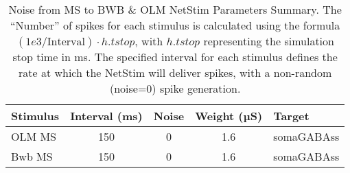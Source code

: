 \begin{table}[htbp]
    \centering
    \caption[Noise from MS to BWB \& OLM Parameters]{Noise from MS to BWB \& OLM NetStim Parameters Summary.
        The ``Number'' of spikes for each stimulus is calculated using the formula \((1e3 / \text{Interval}) \cdot h.tstop\),
        with \(h.tstop\) representing the simulation stop time in ms.
        The specified interval for each stimulus defines the rate at which the NetStim will deliver spikes,
        with a non-random (noise=0) spike generation.}\label{tab:noise_from_MS_to_BWB_OLM}
    \begin{tabular}{lcccl}
        \hline
        \textbf{Stimulus} & \textbf{Interval (ms)} & \textbf{Noise} & \textbf{Weight (µS)} & \textbf{Target} \\
        \hline
        OLM MS            & 150                    & 0              & 1.6                  & somaGABAss      \\
        Bwb MS            & 150                    & 0              & 1.6                  & somaGABAss      \\
        \hline
    \end{tabular}
\end{table}
